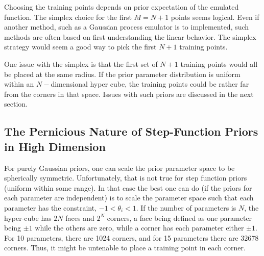\documentclass[UserManual.tex]{subfiles}
\begin{document}
Choosing the training points depends on prior expectation of the emulated function. The simplex choice for the first $M=N+1$ points seems logical. Even if another method, such as a Gaussian process emulator is to implemented, such methods are often based on first understanding the linear behavior. The simplex strategy would seem a good way to pick the first $N+1$ training points.

One issue with the simplex is that the first set of $N+1$ training points would all be placed at the same radius. If the prior parameter distribution is uniform within an $N-$dimensional hyper cube, the training  points could be rather far from the corners in that space. Issues with such priors are discussed in the next section.



\subsection{The Pernicious Nature of Step-Function Priors in High Dimension}

For purely Gaussian priors, one can scale the prior parameter space to be spherically symmetric. Unfortunately, that is not true for step function priors (uniform within some range). In that case the best one can do (if the priors for each parameter are independent) is to scale the parameter space such that each parameter has the constraint, $-1<\theta_i<1$. If the number of parameters is $N$, the hyper-cube has $2N$ faces and $2^N$ corners, a face being defined as one parameter being $\pm 1$ while the others are zero, while a corner has each parameter either $\pm 1$. For 10 parameters, there are 1024 corners, and for 15 parameters there are 32678 corners. Thus, it might be untenable to place a training point in each corner. 
\end{document}
